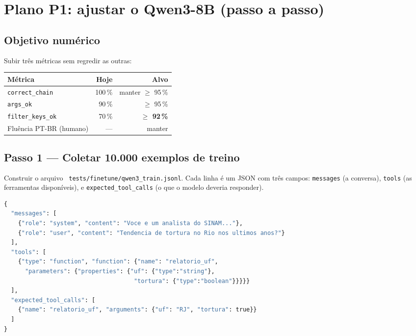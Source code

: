 \documentclass[11pt,a4paper]{article}
\newcommand{\code}[1]{\texttt{\small #1}}
\newcommand{\file}[1]{\texttt{\small\color{black!75} #1}}
\begin{document}
\section{Plano P1: ajustar o Qwen3-8B (passo a passo)}
\label{sec:qwen}

\subsection{Objetivo numérico}

Subir três métricas sem regredir as outras:

\begin{table}[h!]
\centering
\small
\begin{tabular}{@{}l r r@{}}
\toprule
\textbf{Métrica} & \textbf{Hoje} & \textbf{Alvo} \\
\midrule
\code{correct\_chain}    & 100\,\% & manter $\ge$ 95\,\% \\
\code{args\_ok}          &  90\,\% & $\ge$ 95\,\% \\
\code{filter\_keys\_ok}  &  70\,\% & \textbf{$\ge$ 92\,\%} \\
Fluência PT-BR (humano) & --- & manter \\
\bottomrule
\end{tabular}
\end{table}

\subsection{Passo 1 --- Coletar 10.000 exemplos de treino}

Construir o arquivo
\file{tests/finetune/qwen3\_train.jsonl}. Cada linha é um JSON com
três campos: \code{messages} (a conversa), \code{tools} (as
ferramentas disponíveis), e \code{expected\_tool\_calls} (o que o
modelo deveria responder).

\begin{lstlisting}[language=Python,caption={Schema de um exemplo de treino.}]
{
  "messages": [
    {"role": "system", "content": "Voce e um analista do SINAM..."},
    {"role": "user", "content": "Tendencia de tortura no Rio nos ultimos anos?"}
  ],
  "tools": [
    {"type": "function", "function": {"name": "relatorio_uf",
      "parameters": {"properties": {"uf": {"type":"string"},
                                     "tortura": {"type":"boolean"}}}}}
  ],
  "expected_tool_calls": [
    {"name": "relatorio_uf", "arguments": {"uf": "RJ", "tortura": true}}
  ]
}
\end{lstlisting}
\end{document}
